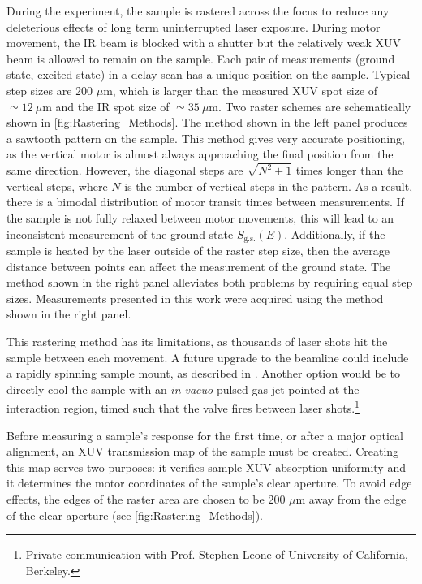 During the experiment, the sample is rastered across the focus to reduce any deleterious effects of long term uninterrupted laser exposure. During motor movement, the IR beam is blocked with a shutter but the relatively weak XUV beam is allowed to remain on the sample. Each pair of measurements (ground state, excited state) in a delay scan has a unique position on the sample. Typical step sizes are 200 $\mu$m, which is larger than the measured XUV spot size of $\simeq 12 \ \mu \textrm{m}$ and the IR spot size of $\simeq 35 \ \mu \textrm{m}$. Two raster schemes are schematically shown in \cref{fig:Rastering_Methods}. The method shown in the left panel produces a sawtooth pattern on the sample. This method gives very accurate positioning, as the vertical motor is almost always approaching the final position from the same direction. However, the diagonal steps are $\sqrt{N^2 + 1}$ times longer than the vertical steps, where $N$ is the number of vertical steps in the pattern. As a result, there is a bimodal distribution of motor transit times between measurements. If the sample is not fully relaxed between motor movements, this will lead to an inconsistent measurement of the ground state $S_{\textrm{g.s.}}(E)$. Additionally, if the sample is heated by the laser outside of the raster step size, then the average distance between points can affect the measurement of the ground state. The method shown in the right panel alleviates both problems by requiring equal step sizes. Measurements presented in this work were acquired using the method shown in the right panel.

This rastering method has its limitations, as thousands of laser shots hit the sample between each movement. A future upgrade to the beamline could include a rapidly spinning sample mount, as described in \cite{jagerAttosecondTransientAbsorption2018}. Another option would be to directly cool the sample with an \textit{in vacuo} pulsed gas jet pointed at the interaction region, timed such that the valve fires between laser shots.\footnote{Private communication with Prof. Stephen Leone of University of California, Berkeley.}

Before measuring a sample's response for the first time, or after a major optical alignment, an XUV transmission map of the sample must be created. Creating this map serves two purposes: it verifies sample XUV absorption uniformity and it determines the motor coordinates of the sample's clear aperture. To avoid edge effects, the edges of the raster area are chosen to be 200 $\mu$m away from the edge of the clear aperture (see \cref{fig:Rastering_Methods}).

